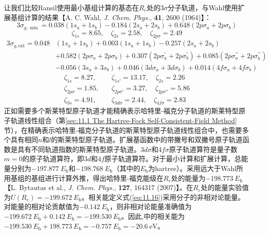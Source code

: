     让我们比较Ransil使用最小基组计算的基态在$R_e$处的$3\sigma$分子轨道，与Wahl使用扩展基组计算的结果【A. C. Wahl, \textit{J. Chem. Phys.}, \textbf{41}, 2600 (1964)】：
    \begin{equation*}
        3\sigma_{g,\min}=0.038(1s_a+1s_b)-0.184(2s_a+2s_b)+0.648(2p\sigma_a+2p\sigma_b)
    \end{equation*}
    \begin{equation*}
        \zeta_{1s} = 8.65, \quad \zeta_{2s} = 2.58, \quad \zeta_{2p\sigma} = 2.49
    \end{equation*}
    \begin{equation*}
        \begin{aligned}
            3\sigma_{g,\text{ext}} = 0.048 & \left( 1s_a + 1s_b \right) + 0.003 \left( 1s_a + 1s_b \right) - 0.257 \left( 2s_a + 2s_b \right) \\
            &+ 0.582 \left(2 p \sigma_{a}+2 p \sigma_{b}\right)+0.307\left(2 p \sigma_{a}^{\prime}+2 p \sigma_{b}^{\prime}\right)+0.085\left(2 p \sigma_{a}^{\prime \prime}+2 p \sigma_{b}^{\prime \prime}\right) \\
            &-0.056(3s_a + 3s_b) + 0.046(3d\sigma_a + 3d\sigma_b) + 0.014(4f\sigma_a + 4f\sigma_b)
        \end{aligned}
    \end{equation*}
    \begin{equation*}
        \begin{aligned}
            \zeta_{1s} = 8.27, &\quad \zeta_{1s'} = 13.17, \quad \zeta_{2s} = 2.26 \\
            \zeta_{2p\sigma}=1.85, &\quad \zeta_{2p\sigma'}=3.27, \quad \zeta_{2p\sigma''}=5.86 \\
            \zeta_{3s} = 4.91, &\quad \zeta_{3d\sigma} = 2.44, \quad \zeta_{4f\sigma} = 2.83
        \end{aligned}
    \end{equation*}
    正如需要多个斯莱特型原子轨道才能精确表示哈特里-福克分子轨道的斯莱特型原子轨道线性组合（第\ref{sec:11.1 The Hartree-Fock Self-Consistent-Field Method}节），在精确表示哈特里-福克分子轨道的斯莱特型原子轨道线性组合中，也需要多个具有相同$n$和$l$的斯莱特型原子轨道。扩展基函数中的带撇号和双撇号原子轨道函数是具有不同轨道指数的斯莱特型原子轨道。$3d\sigma$和$4f\sigma$原子轨道算符是量子数$m=0$的原子轨道算符，即$3d$和$4f$原子轨道算符。对于最小计算和扩展计算，总能量分别为$-197.877\:E_{\mathrm{h}}$和$-198.768\:E_{\mathrm{h}}$（其中的$E_{\mathrm{h}}$为hartree）。采用远大于Wahl所用基组的基组进行计算外推，得出哈特里-福克能级在$R_e$处的能量为$−198.773 \:E_{\mathrm{h}}$【L. Bytautas et al., \textit{J. Chem. Phys.}, \textbf{127}, 164317 (2007)】。在$R_e$处的能量实验值为$U\left(R_e\right) = -199.672\:E_{\mathrm{h}}$。相关能定义式(\ref{eq:11.16})采用分子的非相对论能量。对能量的相对论贡献值为$-0.142\:E_{\mathrm{h}}$，则非相对论能量准确值为$-199.672\:E_{\mathrm{h}} + 0.142\:E_{\mathrm{h}} = -199.530\:E_{\mathrm{h}}$。因此,中的相关能为$-199.530\:E_{\mathrm{h}} + 198.773\:E_{\mathrm{h}} = -0.757\:E_{\mathrm{h}} = -20.6\:\mathrm{eV}$。
